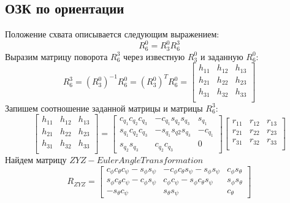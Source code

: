 \documentclass[a4paper,14pt]{extreport}
\begin{document}
	\subsection{ОЗК по ориентации}
	Положение схвата описывается следующим выражением:
	\begin{equation}
		R^0_6 = R^0_3 R^3_6
	\end{equation}
	Выразим матрицу поворота $R^3_6$ через известную $R^0_3$ и заданную $R^0_6$:
	\begin{equation}
		R^3_6 = (R^0_3)^{-1} R^0_6 = (R^0_3)^T R^0_6 = 
		\begin{bmatrix}
		h_{11} & h_{12} & h_{13}\\
		h_{21} & h_{22} & h_{23}\\
		h_{31} & h_{32} & h_{33}\\
		\end{bmatrix}
	\end{equation}
	Запишем соотношение заданной матрицы и матрицы $R_6^3$:
	\begin{equation}
		\begin{bmatrix}
			h_{11} & h_{12} & h_{13}\\
			h_{21} & h_{22} & h_{23}\\
			h_{31} & h_{32} & h_{33}\\
		\end{bmatrix}		
		=
		\begin{bmatrix}
			c_{q_1}c_{q_2}c_{q_3} & -c_{q_1}s_{q_2}s_{q_3} & s_{q_1}\\
			s_{q_1}c_{q_2}c_{q_3} & -s_{q_1}s_{q2}s_{q_3} & -c_{q_1}\\
			s_{q_2}s_{q_3}	& c_{q_2}c_{q_3} & 0
		\end{bmatrix}
		\begin{bmatrix}
			r_{11} & r_{12} & r_{13}\\
			r_{21} & r_{22} & r_{23}\\
			r_{31} & r_{32} & r_{33}\\
		\end{bmatrix}		
	\end{equation}	
	Найдем матрицу $ZYZ-Euler Angle Transformation$
	\begin{equation}
		R_{ZYZ} =
		\begin{bmatrix}
			c_{\phi} c_{\theta} c_{\psi} - s_{\phi} s_{\psi} & -c_{\phi} c_{\theta} s_{\psi} - s_{\phi} s_{\psi} & c_{\phi}s_{\theta} \\
			s_{\phi} c_{\theta} c_{\psi} - c_{\phi} s_{\psi} & c_{\phi} c_{\psi} - s_{\phi} c_{\theta} s_{\psi} & s_{\phi}s_{\theta} \\
			-s_{\theta} c_{\psi} & s_{\theta} s_{\psi} & c_{\theta}
		\end{bmatrix}
	\end{equation}	
\end{document}
